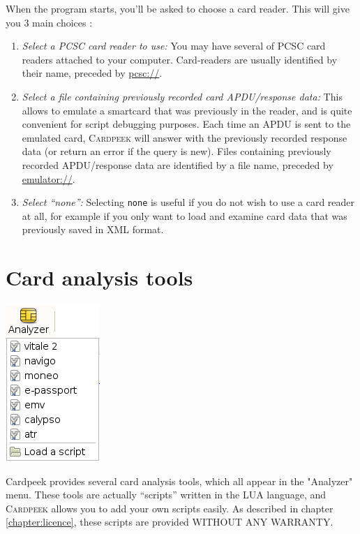 \documentclass[11pt]{report}
\newcommand{\Cardpeek}{\textsc{Cardpeek}}
\begin{document}
When the program starts, you'll be asked to choose a card reader. 
This will give you 3 main choices :
\begin{enumerate}
\item{\emph{Select a PCSC card reader to use:}
  You may have several of PCSC card readers attached to your computer.
      	  Card-readers are usually identified by their name, preceded by \url{pcsc://}.}
\item{\emph{Select a file containing previously recorded card APDU/response data:}
  This allows to emulate a smartcard that was previously in the reader, and is quite convenient
  for script debugging purposes.
  Each time an APDU is sent to the emulated card, \Cardpeek{} will answer with the previously 
  recorded response data (or return an error if the query is new).
  Files containing previously recorded APDU/response data are identified by a file name, preceded by 
  \url{emulator://}.}
\item{\emph{Select ``none'':}
  Selecting \texttt{none} is useful if you do not wish to use a card reader at all, for example if 
  you only want to load and examine card data that was previously saved in XML format.}
\end{enumerate}

\chapter{Card analysis tools}

\begin{center}
\includegraphics[width=.25\textwidth]{graphics/sample-menu-analyzer.png}
\end{center}

Cardpeek provides several card analysis tools, which all appear in the "Analyzer" menu. 
These tools are actually ``scripts'' written in the LUA language, and \Cardpeek{} allows you to 
add your own scripts easily.
As described in chapter \ref{chapter:licence}, these scripts are provided WITHOUT ANY WARRANTY.
\end{document}
